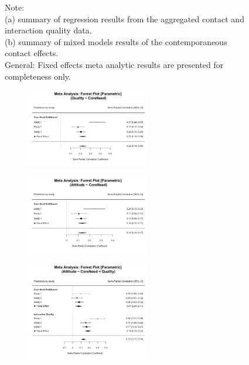 \documentclass[man, 12pt, a4paper]{apa7}
\theoremstyle{break}
\theoremstyle{plain}
\begin{document}
\begin{figure}
\begin{subfigure}{\textwidth}
  \end{subfigure}
  \caption*{Note: \\
  (a) summary of regression results from the aggregated contact and interaction quality data.\\
  (b) summary of mixed models results of the contemporaneous contact effects.\\
  General: Fixed effects meta analytic results are presented for completeness only.}
\end{figure}

\begin{figure}
  \caption{Core Need Fulfillment}
  \begin{subfigure}{\textwidth}
    \caption{}
    \centering\includegraphics[width=0.6\textwidth]{Figures/forestParametricFETheoryQualityCore.png}
  \end{subfigure}
  \begin{subfigure}{\textwidth}
    \caption{}
    \centering\includegraphics[width=0.6\textwidth]{Figures/forestParametricFETheoryAttitudeCore.png}
  \end{subfigure}
  \begin{subfigure}{\textwidth}
    \caption{}
    \centering\includegraphics[width=0.6\textwidth]{Figures/forestParametricFETheoryAttitudeCoreQuality.png}

\end{subfigure}
\end{figure}
\end{document}
